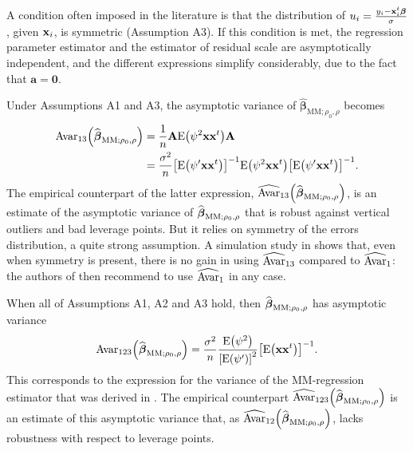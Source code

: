 A condition often imposed in the literature is that the distribution of
$u_{i}=\frac{y_{i}-\mathbf x_{i}^{t}\boldsymbol\beta}{\sigma}$, given
$\mathbf x_{i}$, is symmetric (Assumption A3). If this condition is met, the
regression parameter estimator and the estimator of residual scale are
asymptotically independent, and the different expressions simplify
considerably, due to the fact that $\mathbf{a}=\mathbf{0}$.

Under Assumptions A1 and A3, the asymptotic variance of $\widehat
{\boldsymbol\beta}_{\mathrm{MM};\rho_{0},\rho}$ becomes
\begin{align*}
\mathrm{Avar}_{13}\left(  \sthat{\boldsymbol\beta}_{\mathrm{MM};\rho
_{0},\rho}\right)   &  =\frac{1}{n}\mathbf{A}\mathrm{E}\left(  \psi
^{2}\mathbf{xx}^{t}\right)  \mathbf{A}\\
&  =\frac{\sigma^{2}}{n}\left[  \mathrm{E}\left(  \psi^{\prime}\mathbf{xx}%
^{t}\right)  \right]  ^{-1}\mathrm{E}\left(  \psi^{2}\mathbf{xx}^{t}\right)
\left[  \mathrm{E}\left(  \psi^{\prime}\mathbf{xx}^{t}\right)  \right]  ^{-1}.
\end{align*}
The empirical counterpart of the latter expression, $\sthat{\mathrm{Avar}%
}_{13}\left(  \sthat{\boldsymbol\beta}_{\mathrm{MM};\rho_{0},\rho}\right)
$, is an estimate of the asymptotic variance of $\sthat{\boldsymbol\beta%
}_{\mathrm{MM};\rho_{0},\rho}$ that is robust against vertical outliers and
bad leverage points. But it relies on symmetry of the errors distribution, a
quite strong assumption. A simulation study in \cite{Croux:2003} shows that, even when symmetry is present, there is no gain in using
$\widehat{\mathrm{Avar}}_{13}$ compared to $\widehat{\mathrm{Avar}}_{1}$: the
authors of \cite{Croux:2003} then recommend to use
$\widehat{\mathrm{Avar}}_{1}$ in any case.

When all of Assumptions A1, A2 and A3 hold, then $\sthat{\boldsymbol\beta%
}_{\mathrm{MM};\rho_{0},\rho}$ has asymptotic variance
\[
\mathrm{Avar}_{123}\left(  \sthat{\boldsymbol\beta}_{\mathrm{MM};\rho
_{0},\rho}\right)  =\frac{\sigma^{2}}{n}\frac{\mathrm{E}\left(  \psi
^{2}\right)  }{\left[  \mathrm{E}\left(  \psi^{\prime}\right)  \right]  ^{2}%
}\left[  \mathrm{E}\left(  \mathbf{xx}^{t}\right)  \right]  ^{-1}.
\]
This corresponds to the expression for the variance of the MM-regression
estimator that was derived in \cite{yohai:1987}. The empirical counterpart
$\sthat{\mathrm{Avar}}_{123}\left(  \sthat{\boldsymbol\beta%
}_{\mathrm{MM};\rho_{0},\rho}\right)  $ is an estimate of this asymptotic
variance that, as $\sthat{\mathrm{Avar}}_{12}\left(  \widehat
{\boldsymbol\beta}_{\mathrm{MM};\rho_{0},\rho}\right)  $, lacks robustness
with respect to leverage points.


